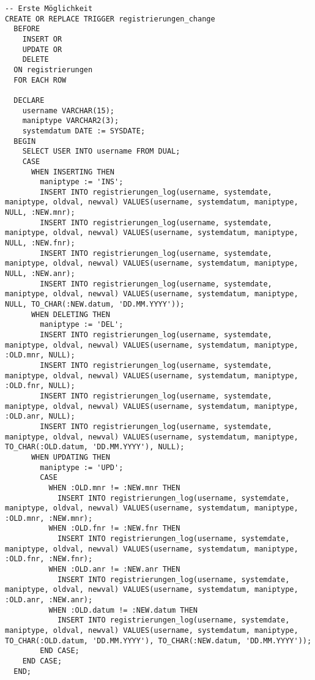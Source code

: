 \documentclass[a4paper,10pt,titlepage=false]{scrreprt}
\begin{document}
\begin{lstlisting}[style=sql, title=Trigger]
-- Erste Möglichkeit
CREATE OR REPLACE TRIGGER registrierungen_change
  BEFORE 
    INSERT OR
    UPDATE OR
    DELETE
  ON registrierungen
  FOR EACH ROW
  
  DECLARE 
    username VARCHAR(15);
    maniptype VARCHAR2(3);
    systemdatum DATE := SYSDATE;
  BEGIN
    SELECT USER INTO username FROM DUAL;
    CASE
      WHEN INSERTING THEN
        maniptype := 'INS';
        INSERT INTO registrierungen_log(username, systemdate, maniptype, oldval, newval) VALUES(username, systemdatum, maniptype, NULL, :NEW.mnr);
        INSERT INTO registrierungen_log(username, systemdate, maniptype, oldval, newval) VALUES(username, systemdatum, maniptype, NULL, :NEW.fnr);
        INSERT INTO registrierungen_log(username, systemdate, maniptype, oldval, newval) VALUES(username, systemdatum, maniptype, NULL, :NEW.anr);
        INSERT INTO registrierungen_log(username, systemdate, maniptype, oldval, newval) VALUES(username, systemdatum, maniptype, NULL, TO_CHAR(:NEW.datum, 'DD.MM.YYYY'));
      WHEN DELETING THEN
        maniptype := 'DEL';
        INSERT INTO registrierungen_log(username, systemdate, maniptype, oldval, newval) VALUES(username, systemdatum, maniptype, :OLD.mnr, NULL);
        INSERT INTO registrierungen_log(username, systemdate, maniptype, oldval, newval) VALUES(username, systemdatum, maniptype, :OLD.fnr, NULL);
        INSERT INTO registrierungen_log(username, systemdate, maniptype, oldval, newval) VALUES(username, systemdatum, maniptype, :OLD.anr, NULL);
        INSERT INTO registrierungen_log(username, systemdate, maniptype, oldval, newval) VALUES(username, systemdatum, maniptype, TO_CHAR(:OLD.datum, 'DD.MM.YYYY'), NULL);
      WHEN UPDATING THEN
        maniptype := 'UPD';
        CASE
          WHEN :OLD.mnr != :NEW.mnr THEN
            INSERT INTO registrierungen_log(username, systemdate, maniptype, oldval, newval) VALUES(username, systemdatum, maniptype, :OLD.mnr, :NEW.mnr);
          WHEN :OLD.fnr != :NEW.fnr THEN
            INSERT INTO registrierungen_log(username, systemdate, maniptype, oldval, newval) VALUES(username, systemdatum, maniptype, :OLD.fnr, :NEW.fnr);
          WHEN :OLD.anr != :NEW.anr THEN
            INSERT INTO registrierungen_log(username, systemdate, maniptype, oldval, newval) VALUES(username, systemdatum, maniptype, :OLD.anr, :NEW.anr);
          WHEN :OLD.datum != :NEW.datum THEN
            INSERT INTO registrierungen_log(username, systemdate, maniptype, oldval, newval) VALUES(username, systemdatum, maniptype, TO_CHAR(:OLD.datum, 'DD.MM.YYYY'), TO_CHAR(:NEW.datum, 'DD.MM.YYYY'));
        END CASE;
    END CASE;
  END;


\end{lstlisting}
\end{document}
